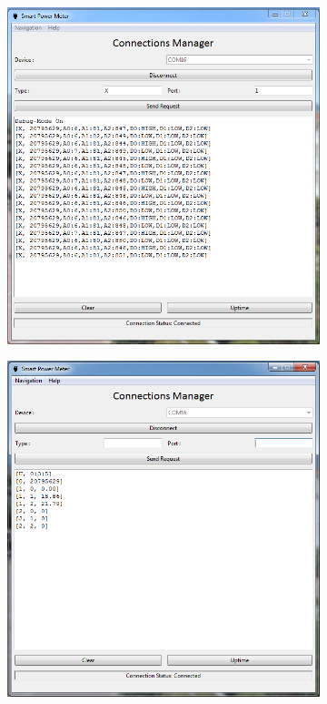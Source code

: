 \begin{figure}[h]
 \footnotesize
 \centering
    \begin{subfigure}[]{0.49\textwidth}
              \centering
  		\includegraphics[width=1\linewidth]{./Figures/screengrab_gui_debug.PNG}
		    \caption{} \label{subfig:screengrab_gui_debug}
     \end{subfigure}
          \begin{subfigure}[]{0.49\textwidth}
             \centering
  		\includegraphics[width=1.0\linewidth]{./Figures/screengrab_gui_other.PNG}

\end{subfigure}
\end{figure}
